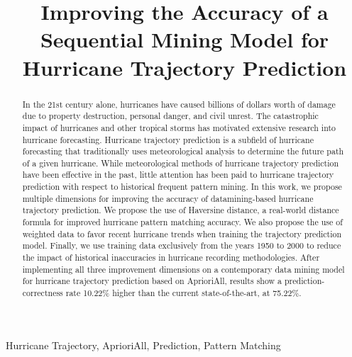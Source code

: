 \documentclass[12pt,conference]{IEEEtran}
\begin{document}
\raggedbottom

\title{Improving the Accuracy of a Sequential Mining Model for Hurricane Trajectory Prediction}

\author{
}

\maketitle

\begin{abstract}

In the 21st century alone, hurricanes have caused billions of dollars worth of damage due to property destruction, personal danger, and civil unrest. The catastrophic impact of hurricanes and other tropical storms has motivated extensive research into hurricane forecasting. Hurricane trajectory prediction is a subfield of hurricane forecasting that traditionally uses meteorological analysis to determine the future path of a given hurricane. While meteorological methods of hurricane trajectory prediction have been effective in the past, little attention has been paid to hurricane trajectory prediction with respect to historical frequent pattern mining. In this work, we propose multiple dimensions for improving the accuracy of datamining-based hurricane trajectory prediction. We propose the use of Haversine distance, a real-world distance formula for improved hurricane pattern matching accuracy. We also propose the use of weighted data to favor recent hurricane trends when training the trajectory prediction model. Finally, we use training data exclusively from the years 1950 to 2000 to reduce the impact of historical inaccuracies in hurricane recording methodologies. After implementing all three improvement dimensions on a contemporary data mining model for hurricane trajectory prediction based on AprioriAll, results show a prediction-correctness rate 10.22\% higher than the current state-of-the-art, at 75.22\%.

\end{abstract}

\begin{IEEEkeywords}
Hurricane Trajectory, AprioriAll, Prediction, Pattern Matching
\end{IEEEkeywords}
\end{document}
